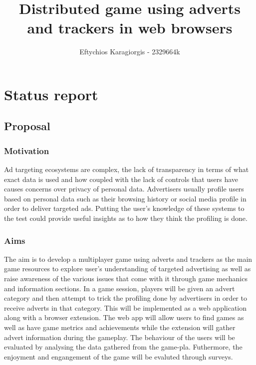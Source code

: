 \documentclass[11pt]{article}
\title{ Distributed game using adverts and trackers in web browsers}
\author{ Eftychios Karagiorgis - 2329664k }
\begin{document}
    \maketitle
    
    
     

\section{Status report}

\subsection{Proposal}\label{proposal}

\subsubsection{Motivation}\label{motivation}

Ad targeting ecosystems are complex, the lack of transparency in terms of what exact data is used and how coupled with the lack of controls that users have causes concerns over privacy of personal data. Advertisers usually profile users based on personal data such as their browsing history or social media profile in order to deliver targeted ads. Putting the user's knowledge of these systems to the test could provide useful insights as to how they think the profiling is done.

\subsubsection{Aims}\label{aims}

The aim is to develop a multiplayer game using adverts and trackers as the main game resources to explore user's understanding of targeted advertising as well as raise awareness of the various issues that come with it through game mechanics and information sections. In a game session, players will be given an advert category and then attempt to trick the profiling done by advertisers in order to receive adverts in that category. This will be implemented as a web application along with a browser extension. The web app will allow users to find games as well as have game metrics and achievements while the extension will gather advert information during the gameplay. The behaviour of the users will be evaluated by analysing the data gathered from the game-pla. Futhermore, the enjoyment and engangement of the game will be evaluted through surveys.
\end{document}
